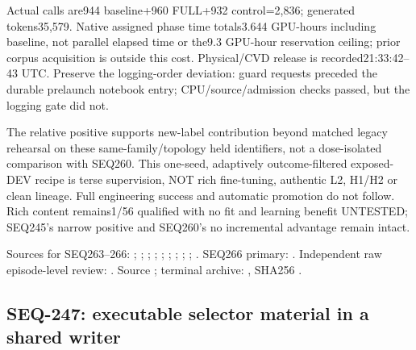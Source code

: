 \documentclass[11pt]{article}
\begin{document}
Actual calls are944 baseline+960 FULL+932 control=2,836; generated tokens35,579.
Native assigned phase time totals3.644 GPU-hours including baseline, not parallel
elapsed time or the9.3 GPU-hour reservation ceiling; prior corpus acquisition is
outside this cost. Physical/CVD release is recorded21:33:42--43 UTC. Preserve the
logging-order deviation: guard requests preceded the durable prelaunch notebook
entry; CPU/source/admission checks passed, but the logging gate did not.

The relative positive supports new-label contribution beyond matched legacy
rehearsal on these same-family/topology held identifiers, not a dose-isolated
comparison with SEQ260. This one-seed, adaptively outcome-filtered exposed-DEV
recipe is terse supervision, NOT rich fine-tuning, authentic L2, H1/H2 or clean
lineage. Full engineering success and automatic promotion do not follow.
Rich content remains1/56 qualified with no fit and learning benefit UNTESTED;
SEQ245's narrow positive and SEQ260's no incremental advantage remain intact.

Sources for SEQ263--266: ;
;
;
;
;
;
;
;
;
.
SEQ266 primary: .
Independent raw episode-level review: .
Source ; terminal archive:
,
SHA256 .

\subsection{SEQ-247: executable selector material in a shared writer}
\label{sec:selector-transfer-write}
\end{document}
